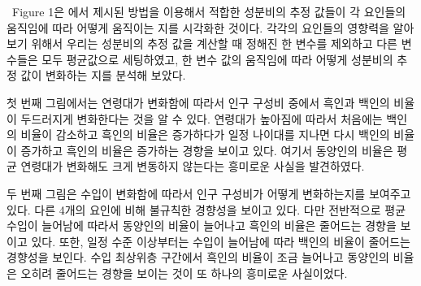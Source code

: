 \begin{table}[t]
\ \quad Figure 1은  \citet{jeon2018additive}에서 제시된 방법을 이용해서 적합한 성분비의 추정 값들이 각 요인들의 움직임에 따라 어떻게 움직이는 지를 시각화한 것이다. 각각의 요인들의 영향력을 알아보기 위해서 우리는 성분비의 추정 값을 계산할 때 정해진 한 변수를 제외하고 다른 변수들은 모두 평균값으로 세팅하였고, 한 변수 값의 움직임에 따라 어떻게 성분비의 추정 값이 변화하는 지를 분석해 보았다. 

첫 번째 그림에서는 연령대가 변화함에 따라서 인구 구성비 중에서 흑인과 백인의 비율이 두드러지게 변화한다는 것을 알 수 있다. 연령대가 높아짐에 따라서 처음에는 백인의 비율이 감소하고 흑인의 비율은 증가하다가 일정 나이대를 지나면 다시 백인의 비율이 증가하고 흑인의 비율은 증가하는 경향을 보이고 있다. 여기서 동양인의 비율은 평균 연령대가 변화해도 크게 변동하지 않는다는 흥미로운 사실을 발견하였다. 

두 번째 그림은 수입이 변화함에 따라서 인구 구성비가 어떻게 변화하는지를 보여주고 있다. 다른 4개의 요인에 비해 불규칙한 경향성을 보이고 있다. 다만 전반적으로 평균 수입이 늘어남에 따라서 동양인의 비율이 늘어나고 흑인의 비율은 줄어드는 경향을 보이고 있다. 또한, 일정 수준 이상부터는 수입이 늘어남에 따라 백인의 비율이 줄어드는 경향성을 보인다. 수입 최상위층 구간에서 흑인의 비율이 조금 늘어나고 동양인의 비율은 오히려 줄어드는 경향을 보이는 것이 또 하나의 흥미로운 사실이었다.


\end{table}
